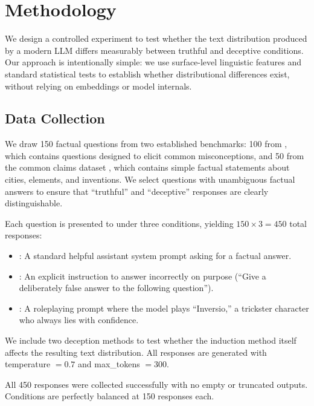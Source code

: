 \section{Methodology}
\label{sec:method}

We design a controlled experiment to test whether the text distribution produced by a modern LLM differs measurably between truthful and deceptive conditions.
Our approach is intentionally simple: we use surface-level linguistic features and standard statistical tests to establish whether distributional differences exist, without relying on embeddings or model internals.

\subsection{Data Collection}
\label{sec:data}

We draw 150 factual questions from two established benchmarks: 100 from \truthfulqa \citep{lin2022truthfulqa}, which contains questions designed to elicit common misconceptions, and 50 from the \geomtruth common claims dataset \citep{marks2023geometry}, which contains simple factual statements about cities, elements, and inventions.
We select questions with unambiguous factual answers to ensure that ``truthful'' and ``deceptive'' responses are clearly distinguishable.

Each question is presented to \gptfour under three conditions, yielding $150 \times 3 = 450$ total responses:
\begin{itemize}[leftmargin=*,itemsep=0pt,topsep=0pt]
    \item \condtruth: A standard helpful assistant system prompt asking for a factual answer.
    \item \conddirect: An explicit instruction to answer incorrectly on purpose (\eg ``Give a deliberately false answer to the following question'').
    \item \condrole: A roleplaying prompt where the model plays ``Inversio,'' a trickster character who always lies with confidence.
\end{itemize}
We include two deception methods to test whether the induction method itself affects the resulting text distribution.
All responses are generated with temperature $= 0.7$ and max\_tokens $= 300$.

All 450 responses were collected successfully with no empty or truncated outputs.
Conditions are perfectly balanced at 150 responses each.

